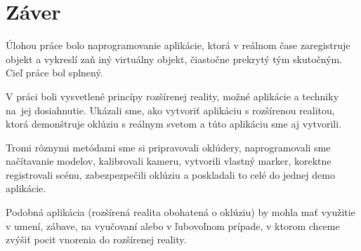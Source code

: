 \chapter*{Záver}

Úlohou práce bolo naprogramovanie aplikácie, ktorá v reálnom čase zaregistruje objekt a vykreslí zaň iný virtuálny objekt, čiastočne prekrytý tým skutočným. Cieľ práce bol splnený.

V práci boli vysvetlené princípy rozšírenej reality, možné aplikácie a techniky na~jej dosiahnutie. Ukázali sme, ako vytvoriť aplikáciu s rozšírenou realitou, ktorá demonštruje oklúziu s reálnym svetom a túto aplikáciu sme aj vytvorili.

Tromi rôznymi metódami sme si pripravovali oklúdery, naprogramovali sme načítavanie modelov, kalibrovali kameru, vytvorili vlastný marker, korektne registrovali scénu, zabezpezpečili oklúziu a poskladali to celé do jednej demo aplikácie.

Podobná aplikácia (rozšírená realita obohatená o oklúziu) by mohla mať využitie v umení, zábave, na vyučovaní alebo v ľubovoľnom prípade, v ktorom chceme zvýšiť pocit vnorenia do rozšírenej reality.